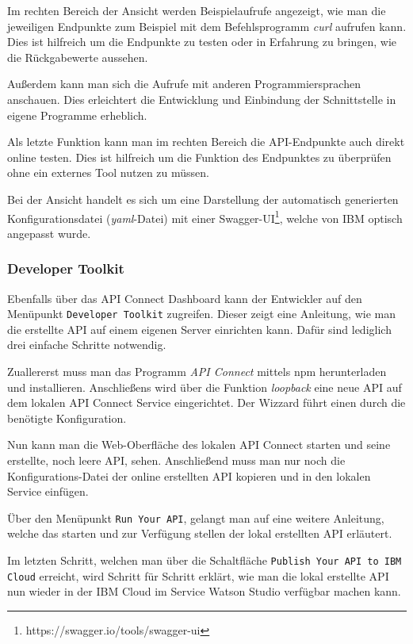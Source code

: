 Im rechten Bereich der Ansicht werden Beispielaufrufe angezeigt, wie man die jeweiligen Endpunkte zum Beispiel mit dem
Befehlsprogramm \textit{curl} aufrufen kann. Dies ist hilfreich um die Endpunkte zu testen oder in Erfahrung zu bringen,
wie die Rückgabewerte aussehen.

Außerdem kann man sich die Aufrufe mit anderen Programmiersprachen anschauen. Dies erleichtert die Entwicklung und
Einbindung der Schnittstelle in eigene Programme erheblich.

Als letzte Funktion kann man im rechten Bereich die API-Endpunkte auch direkt online testen. Dies ist hilfreich um die
Funktion des Endpunktes zu überprüfen ohne ein externes Tool nutzen zu müssen.

Bei der Ansicht handelt es sich um eine Darstellung der automatisch generierten Konfigurationsdatei (\textit{yaml}-Datei)
mit einer Swagger-UI\footnote{https://swagger.io/tools/swagger-ui}, welche von IBM optisch angepasst wurde.

\subsubsection{Developer Toolkit}
Ebenfalls über das API Connect Dashboard kann der Entwickler auf den Menüpunkt \texttt{Developer Toolkit} zugreifen.
Dieser zeigt eine Anleitung, wie man die erstellte API auf einem eigenen Server einrichten kann. Dafür sind lediglich
drei einfache Schritte notwendig.

Zuallererst muss man das Programm \textit{API Connect} mittels npm herunterladen und installieren. Anschließens wird über
die Funktion \textit{loopback} eine neue API auf dem lokalen API Connect Service eingerichtet. Der Wizzard führt einen
durch die benötigte Konfiguration.

Nun kann man die Web-Oberfläche des lokalen API Connect starten und seine erstellte, noch leere API, sehen. Anschließend
muss man nur noch die Konfigurations-Datei der online erstellten API kopieren und in den lokalen Service einfügen.

Über den Menüpunkt \texttt{Run Your API}, gelangt man auf eine weitere Anleitung, welche das starten und zur Verfügung
stellen der lokal erstellten API erläutert.

Im letzten Schritt, welchen man über die Schaltfläche \texttt{Publish Your API to IBM Cloud} erreicht, wird Schritt für
Schritt erklärt, wie man die lokal erstellte API nun wieder in der IBM Cloud im Service Watson Studio verfügbar machen
kann.

